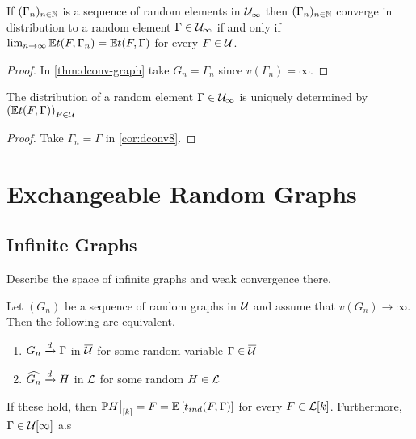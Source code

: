 \documentclass{article}
\begin{document}
\begin{cor}
  \label{cor:dconv8}
  If $(\Gamma_n)_{n \in \N}$ is a sequence of random elements in $\Ug_{\infty}$ then $(\Gamma_n)_{n \in \N}$ converge in distribution to a random element $\Gamma \in \Ug_{\infty}$ if and only if $\lim_{n \to \infty} \Ex t(F, \Gamma_n) = \Ex t(F, \Gamma)$ for every $F \in \Ug$.
\end{cor}
\begin{proof}
  In \autoref{thm:dconv-graph} take $G_n=\Gamma_n$ since $v(\Gamma_n) = \infty$.
\end{proof}
\begin{cor}
  The distribution of a random element $\Gamma \in \Ug_{\infty}$ is uniquely determined by $\left(\Ex t(F, \Gamma)\right)_{F \in \Ug}$
\end{cor}
\begin{proof}
  Take $\Gamma_n = \Gamma$ in \autoref{cor:dconv8}.
\end{proof}

\section{Exchangeable Random Graphs}
\subsection{Infinite Graphs}
Describe the space of infinite graphs and weak convergence there.

\begin{theorem}
   Let $\left( G_n \right)$ be a sequence of random graphs in $\Ug$ and assume that $v(G_n) \to \infty$. Then the following are equivalent.
  \begin{enumerate}
    \item $G_n \xrightarrow{d} \Gamma$ in $\Ug*$ for some random variable $\Gamma \in \Ug*$
    \item $\widehat{G_n} \xrightarrow{d} H$ in $\Lg$ for some random $H \in \Lg$
  \end{enumerate}
  If these hold, then $\Pb{\restr{H}{[k]} = F} = \Ex[ t_{ind}(F, \Gamma) ]$ for every $F \in \Lg[k]$. Furthermore, $\Gamma \in \Ug[\infty]$ a.s
   
  \label{thm:conv-to-infinite-graphs}
\end{theorem}

\printbibliography
\end{document}
